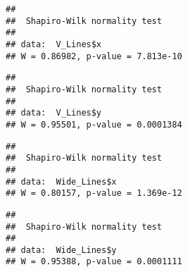 \documentclass[
]{article}
\newenvironment{Shaded}{\begin{snugshade}}{\end{snugshade}}
\newcommand{\FunctionTok}[1]{\textcolor[rgb]{0.13,0.29,0.53}{\textbf{#1}}}
\newcommand{\NormalTok}[1]{#1}
\newcommand{\OtherTok}[1]{\textcolor[rgb]{0.56,0.35,0.01}{#1}}
\newcommand{\SpecialCharTok}[1]{\textcolor[rgb]{0.81,0.36,0.00}{\textbf{#1}}}
\newcommand{\StringTok}[1]{\textcolor[rgb]{0.31,0.60,0.02}{#1}}
\begin{document}
\begin{verbatim}
## 
##  Shapiro-Wilk normality test
## 
## data:  V_Lines$x
## W = 0.86982, p-value = 7.813e-10
\end{verbatim}

\begin{Shaded}
\end{Shaded}

\begin{verbatim}
## 
##  Shapiro-Wilk normality test
## 
## data:  V_Lines$y
## W = 0.95501, p-value = 0.0001384
\end{verbatim}

\begin{Shaded}
\end{Shaded}

\begin{verbatim}
## 
##  Shapiro-Wilk normality test
## 
## data:  Wide_Lines$x
## W = 0.80157, p-value = 1.369e-12
\end{verbatim}

\begin{Shaded}
\end{Shaded}

\begin{verbatim}
## 
##  Shapiro-Wilk normality test
## 
## data:  Wide_Lines$y
## W = 0.95388, p-value = 0.0001111
\end{verbatim}

\begin{Shaded}
\end{Shaded}
\end{document}
